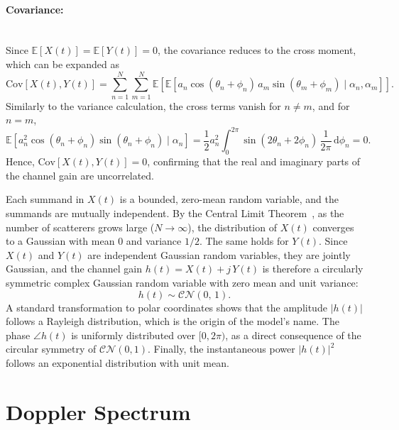 \paragraph*{Covariance:}~\\
Since $\mathbb{E}[X(t)] = \mathbb{E}[Y(t)] = 0$, the covariance reduces to the cross moment, which can be expanded as
\begin{equation}
    \mathrm{Cov}[X(t),Y(t)]
    = \sum_{n=1}^{N}\sum_{m=1}^{N}
      \mathbb{E}\!\left[\mathbb{E}\!\left[a_n \cos(\theta_n + \phi_n) \, a_m \sin(\theta_m + \phi_m) \mid \alpha_n, \alpha_m\right]\right].
\end{equation}
Similarly to the variance calculation, the cross terms vanish for $n \neq m$, and for $n = m$,
\begin{equation}
    \mathbb{E}\!\left[a_n^2 \cos(\theta_n + \phi_n)\sin(\theta_n + \phi_n) \mid \alpha_n\right]
    = \frac{1}{2} a_n^2 \int_{0}^{2\pi} \sin(2\theta_n + 2\phi_n)\,\frac{1}{2\pi}\,\mathrm{d}\phi_n
    = 0.
\end{equation}
Hence, $\mathrm{Cov}[X(t),Y(t)] = 0$, confirming that the real and imaginary parts of the channel gain are uncorrelated.
\bigskip

Each summand in $X(t)$ is a bounded, zero-mean random variable, and the summands are mutually independent.
By the Central Limit Theorem~\cite{central_limit_theorem_1935}, as the number of scatterers grows large ($N \to \infty$), the distribution of $X(t)$ converges to a Gaussian with mean $0$ and variance $1/2$.
The same holds for $Y(t)$.
Since $X(t)$ and $Y(t)$ are independent Gaussian random variables, they are jointly Gaussian, and the channel gain $h(t) = X(t) + j\,Y(t)$ is therefore a circularly symmetric complex Gaussian random variable with zero mean and unit variance:
\begin{equation}
\label{eq:channel_gain_distribution}
    h(t) \sim \mathcal{CN}(0,\,1).
\end{equation}
A standard transformation to polar coordinates shows that the amplitude $|h(t)|$ follows a Rayleigh distribution, which is the origin of the model's name.
The phase $\angle h(t)$ is uniformly distributed over $[0, 2\pi)$, as a direct consequence of the circular symmetry of $\mathcal{CN}(0,1)$.
Finally, the instantaneous power $|h(t)|^2$ follows an exponential distribution with unit mean. 

\section{Doppler Spectrum}
\label{appendix_section:doppler_spectrum}

